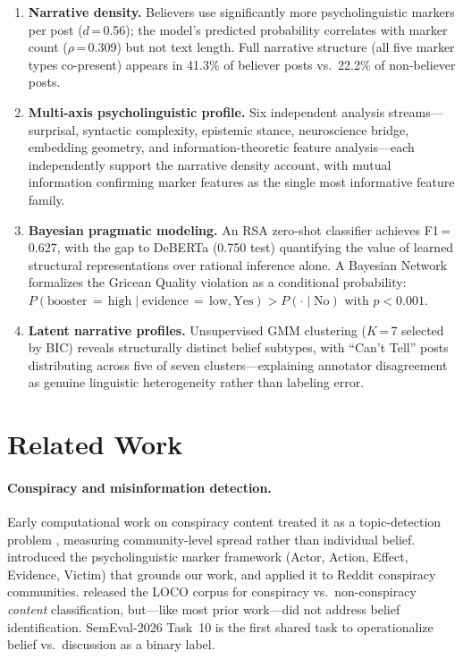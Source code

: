 \documentclass[11pt]{article}
\begin{document}
\begin{enumerate}[leftmargin=*,nosep,itemsep=2pt]
\item \textbf{Narrative density.}
Believers use significantly more psycholinguistic markers per post
($d$\,=\,0.56); the model's predicted probability correlates with marker
count ($\rho$\,=\,0.309) but not text length.
Full narrative structure (all five marker types co-present) appears in
41.3\% of believer posts vs.\ 22.2\% of non-believer posts.

\item \textbf{Multi-axis psycholinguistic profile.}
Six independent analysis streams---surprisal, syntactic complexity,
epistemic stance, neuroscience bridge, embedding geometry, and
information-theoretic feature analysis---each independently support the
narrative density account, with mutual information confirming marker
features as the single most informative feature family.

\item \textbf{Bayesian pragmatic modeling.}
An RSA zero-shot classifier achieves F1\,=\,0.627, with the gap to
DeBERTa (0.750 test) quantifying the value of learned structural
representations over rational inference alone.
A Bayesian Network formalizes the Gricean Quality violation as a
conditional probability: $P(\text{booster}\,{=}\,\text{high} \mid
\text{evidence}\,{=}\,\text{low}, \text{Yes}) > P(\cdot \mid \text{No})$
with $p < 0.001$.

\item \textbf{Latent narrative profiles.}
Unsupervised GMM clustering ($K$\,=\,7 selected by BIC) reveals
structurally distinct belief subtypes, with ``Can't Tell'' posts
distributing across five of seven clusters---explaining annotator
disagreement as genuine linguistic heterogeneity rather than labeling
error.
\end{enumerate}

\section{Related Work}
\label{sec:related}

\paragraph{Conspiracy and misinformation detection.}
Early computational work on conspiracy content treated it as a
topic-detection problem \citep{bessi2015science,vicario2016spreading},
measuring community-level spread rather than individual belief.
\citet{samory2018conspiracy} introduced the psycholinguistic marker
framework (Actor, Action, Effect, Evidence, Victim) that grounds our
work, and applied it to Reddit conspiracy communities.
\citet{miani2021loco} released the LOCO corpus for conspiracy vs.\
non-conspiracy \emph{content} classification, but---like most prior
work---did not address belief identification.
SemEval-2026 Task~10 \citep{samory-etal-2026-semeval} is the first
shared task to operationalize belief vs.\ discussion as a binary label.
\end{document}
